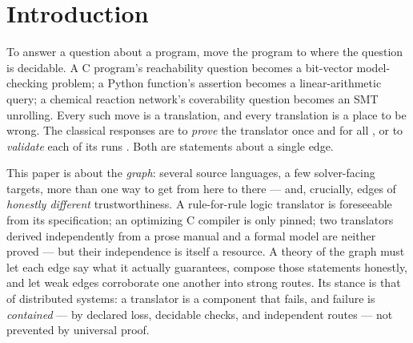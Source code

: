 
\section{Introduction}
\label{sec:intro}

To answer a question about a program, move the program to where the
question is decidable. A C program's reachability question becomes a
bit-vector model-checking problem; a Python function's assertion becomes
a linear-arithmetic query; a chemical reaction network's coverability
question becomes an SMT unrolling. Every such move is a translation, and
every translation is a place to be wrong. The classical responses are to
\emph{prove} the translator once and for all
\citep{leroy2009compcert,kumar2014cakeml}, or to \emph{validate} each of
its runs \citep{pnueli1998tv,necula2000tv,lopes2021alive2}. Both are
statements about a single edge.\repofootnote

This paper is about the \emph{graph}: several source languages, a few
solver-facing targets, more than one way to get from here to there ---
and, crucially, edges of \emph{honestly different} trustworthiness. A
rule-for-rule logic translator is foreseeable from its specification; an
optimizing C compiler is only pinned; two translators derived
independently from a prose manual and a formal model are neither proved
--- but their independence is itself a resource. A theory of the graph
must let each edge say what it actually guarantees, compose those
statements honestly, and let weak edges corroborate one another into
strong routes. Its stance is that of distributed systems: a translator
is a component that fails, and failure is \emph{contained} --- by
declared loss, decidable checks, and independent routes --- not
prevented by universal proof.

